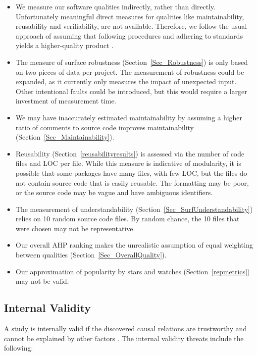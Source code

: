 \documentclass[final, 3p, times, authoryear]{elsarticle}
\begin{document}
\begin{itemize}
\item We measure our software qualities indirectly, rather than directly.
Unfortunately meaningful direct measures for qualities like maintainability,
reusability and verifiability, are not available.  Therefore, we follow the
usual approach of assuming that following procedures and adhering to standards
yields a higher-quality product \citep[p.\ 112]{VanVliet2000}.
\item The measure of surface robustness (Section~\ref{Sec_Robustness}) is only
based on two pieces of data per project. The measurement of robustness could be
expanded, as it currently only measures the impact of unexpected input. Other
intentional faults could be introduced, but this would require a larger
investment of measurement time. 
\item We may have inaccurately estimated maintainability by assuming a higher
ratio of comments to source code improves maintainability
(Section~\ref{Sec_Maintainability}). 
\item Reusability (Section~\ref{reusabilityresults}) is assessed via the number
of code files and LOC per file. While this measure is indicative of modularity,
it is possible that some packages have many files, with few LOC, but the files
do not contain source code that is easily reusable. The formatting may be poor,
or the source code may be vague and have ambiguous identifiers. 
\item The measurement of understandability
(Section~\ref{Sec_SurfUnderstandability}) relies on 10 random source code files.
By random chance, the 10 files that were chosen may not be representative. 
\item Our overall AHP ranking makes the unrealistic assumption of equal
weighting between qualities (Section~\ref{Sec_OverallQuality}).
\item Our approximation of popularity by stars and watches
(Section~\ref{repmetrics}) may not be valid. 
\end{itemize}

\subsection{Internal Validity} \label{Sec_InternalValidity}

A study is internally valid if the discovered causal relations are trustworthy
and cannot be explained by other factors \citep{RunesonAndHost2009}. The
internal validity threats include the following:
\end{document}
